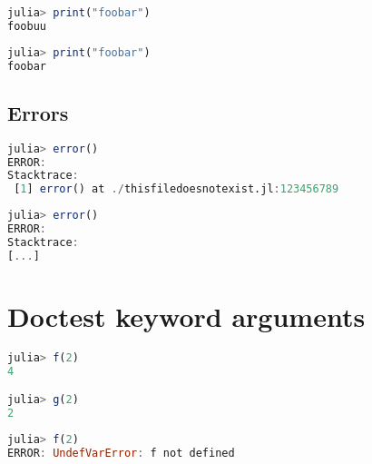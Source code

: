 \begin{lstlisting}[language=julia, style=jlcodestyle]
julia> print("foobar")
foobuu
\end{lstlisting}






\begin{lstlisting}[language=julia, style=jlcodestyle]
julia> print("foobar")
foobar
\end{lstlisting}





\section{Errors}



\label{2821521703884307412}{}





\begin{lstlisting}[language=julia, style=jlcodestyle]
julia> error()
ERROR:
Stacktrace:
 [1] error() at ./thisfiledoesnotexist.jl:123456789
\end{lstlisting}




\begin{lstlisting}[language=julia, style=jlcodestyle]
julia> error()
ERROR:
Stacktrace:
[...]
\end{lstlisting}





\chapter{Doctest keyword arguments}



\label{6180046600625199060}{}



\begin{lstlisting}[language=julia, style=jlcodestyle]
julia> f(2)
4

julia> g(2)
2
\end{lstlisting}




\begin{lstlisting}[language=julia, style=jlcodestyle]
julia> f(2)
ERROR: UndefVarError: f not defined
\end{lstlisting}




